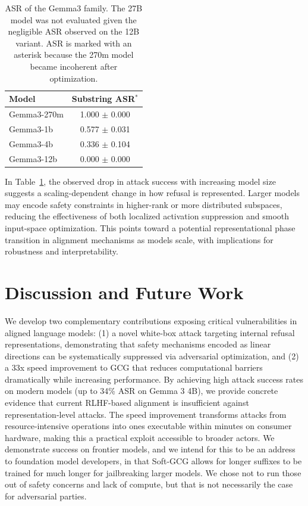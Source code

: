 \documentclass[letterpaper]{article} %
\begin{document}
\begin{table}[h]
    \centering
    \renewcommand{\arraystretch}{1}
    \begin{tabular}{@{}l c@{}}
        \toprule
        \textbf{Model} & \textbf{Substring ASR$^*$} \\
        \midrule
        Gemma3-270m & 1.000 $\pm$ 0.000 \\
        Gemma3-1b   & 0.577 $\pm$ 0.031 \\
        Gemma3-4b   & 0.336 $\pm$ 0.104 \\
        Gemma3-12b  & 0.000 $\pm$ 0.000 \\
        \bottomrule
    \end{tabular}
    \caption{
        ASR of the Gemma3 family. The 27B model was not evaluated given the negligible ASR observed on the 12B variant. 
        ASR is marked with an asterisk because the 270m model became incoherent after optimization.
    }
    \label{tab:sgcg_gemma}
\end{table}

In Table~\ref{tab:sgcg_gemma}, the observed drop in attack success with increasing model size suggests a scaling-dependent change in how refusal is represented. Larger models may encode safety constraints in higher-rank or more distributed subspaces, reducing the effectiveness of both localized activation suppression and smooth input-space optimization. This points toward a potential representational phase transition in alignment mechanisms as models scale, with implications for robustness and interpretability.
\section{Discussion and Future Work}

We develop two complementary contributions exposing critical vulnerabilities in aligned language models: (1) a novel white-box attack targeting internal refusal representations, demonstrating that safety mechanisms encoded as linear directions can be systematically suppressed via adversarial optimization, and (2) a 33x speed improvement to GCG that reduces computational barriers dramatically while increasing performance. By achieving high attack success rates on modern models (up to 34\% ASR on Gemma 3 4B), we provide concrete evidence that current RLHF-based alignment is insufficient against representation-level attacks. The speed improvement transforms attacks from resource-intensive operations into ones executable within minutes on consumer hardware, making this a practical exploit accessible to broader actors. We demonstrate success on frontier models, and we intend for this to be an address to foundation model developers, in that Soft-GCG allows for longer suffixes to be trained for much longer for jailbreaking larger models. We chose not to run those out of safety concerns and lack of compute, but that is not necessarily the case for adversarial parties.
\end{document}
